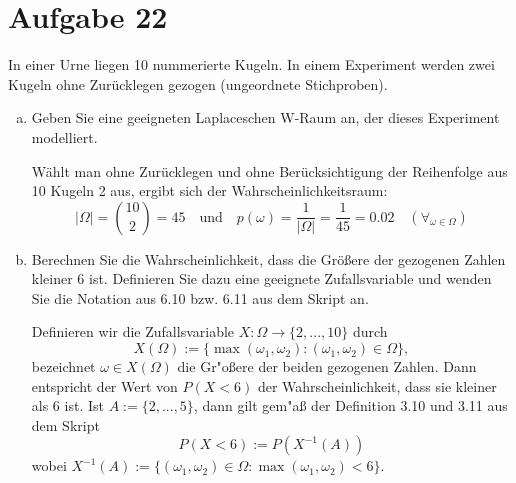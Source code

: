 \section{Aufgabe 22}
\setcounter{section}{22}

In einer Urne liegen 10 nummerierte Kugeln. In einem Experiment werden zwei
Kugeln ohne Zurücklegen gezogen (ungeordnete Stichproben).
\begin{enumerate}[(a)]
    \item Geben Sie eine geeigneten Laplaceschen W-Raum an, der dieses
        Experiment modelliert.

        Wählt man ohne Zurücklegen und ohne Berücksichtigung der Reihenfolge
        aus 10 Kugeln 2 aus, ergibt sich der Wahrscheinlichkeitsraum:
        \begin{equation*}
            |\Omega| = \binom{10}{2} = 45 \quad\text{und}\quad p(\omega) = \dfrac{1}{|\Omega|} = \dfrac{1}{45} = 0.02 \quad (\forall_{\omega \in \Omega})
        \end{equation*}

    \item Berechnen Sie die Wahrscheinlichkeit, dass die Größere der gezogenen
        Zahlen kleiner 6 ist. Definieren Sie dazu eine geeignete
        Zufallsvariable und wenden Sie die Notation aus 6.10 bzw. 6.11 aus dem
        Skript an.

        Definieren wir die Zufallsvariable $X: \Omega \rightarrow \{2,...,10\}$ durch
        \begin{equation*}
            X(\Omega) := \{\max(\omega_1, \omega_2) : (\omega_1, \omega_2) \in \Omega\},
        \end{equation*}
        bezeichnet $\omega \in X(\Omega)$ die Gr"o{\ss}ere der beiden gezogenen
        Zahlen. Dann entspricht der Wert von $P(X < 6)$ der Wahrscheinlichkeit,
        dass sie kleiner als 6 ist. Ist $A := \{2,...,5\}$, dann gilt
        gem"a{\ss} der Definition 3.10 und 3.11 aus dem Skript
        \begin{equation*}
            P(X < 6) := P(X^{-1}(A))
        \end{equation*}
        wobei $X^{-1}(A) := \{(\omega_1, \omega_2) \in \Omega : \max(\omega_1, \omega_2) < 6\}$.


\end{enumerate}
